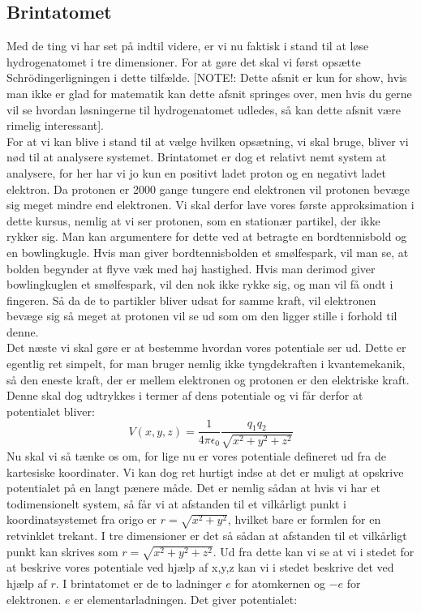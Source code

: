 \documentclass[../../Atom-ogMolekylefysik.tex]{subfiles}
\begin{document}
\subsection*{Brintatomet}
Med de ting vi har set på indtil videre, er vi nu faktisk i stand til at løse hydrogenatomet i tre dimensioner. For at gøre det skal vi først opsætte Schrödingerligningen i dette tilfælde. [NOTE!: Dette afsnit er kun for show, hvis man ikke er glad for matematik kan dette afsnit springes over, men hvis du gerne vil se hvordan løsningerne til hydrogenatomet udledes, så kan dette afsnit være rimelig interessant].\\
For at vi kan blive i stand til at vælge hvilken opsætning, vi skal bruge, bliver vi nød til at analysere systemet. Brintatomet er dog et relativt nemt system at analysere, for her har vi jo kun en positivt ladet proton og en negativt ladet elektron. Da protonen er 2000 gange tungere end elektronen vil protonen bevæge sig meget mindre end elektronen. Vi skal derfor lave vores første approksimation i dette kursus, nemlig at vi ser protonen, som en stationær partikel, der ikke rykker sig. Man kan argumentere for dette ved at betragte en bordtennisbold og en bowlingkugle. Hvis man giver bordtennisbolden et smølfespark, vil man se, at bolden begynder at flyve væk med høj hastighed. Hvis man derimod giver bowlingkuglen et smølfespark, vil den nok ikke rykke sig, og man vil få ondt i fingeren. Så da de to partikler bliver udsat for samme kraft, vil elektronen bevæge sig så meget at protonen vil se ud som om den ligger stille i forhold til denne.\\
Det næste vi skal gøre er at bestemme hvordan vores potentiale ser ud. Dette er egentlig ret simpelt, for man bruger nemlig ikke tyngdekraften i kvantemekanik, så den eneste kraft, der er mellem elektronen og protonen er den elektriske kraft. Denne skal dog udtrykkes i termer af dens potentiale og vi får derfor at potentialet bliver:
\begin{equation*}
    V(x,y,z)=\frac{1}{4\pi\epsilon_{0}}\frac{q_{1}q_{2}}{\sqrt{x^2+y^2+z^2}}
\end{equation*}
Nu skal vi så tænke os om, for lige nu er vores potentiale defineret ud fra de kartesiske koordinater. Vi kan dog ret hurtigt indse at det er muligt at opskrive potentialet på en langt pænere måde. Det er nemlig sådan at hvis vi har et todimensionelt system, så får vi at afstanden til et vilkårligt punkt i koordinatsystemet fra origo er $r=\sqrt{x^2+y^2}$, hvilket bare er formlen for en retvinklet trekant. I tre dimensioner er det så sådan at afstanden til et vilkårligt punkt kan skrives som $r=\sqrt{x^2+y^2+z^2}$. Ud fra dette kan vi se at vi i stedet for at beskrive vores potentiale ved hjælp af x,y,z kan vi i stedet beskrive det ved hjælp af $r$. I brintatomet er de to ladninger $e$ for atomkernen og $-e$ for elektronen. $e$ er elementarladningen. Det giver potentialet:
\end{document}
